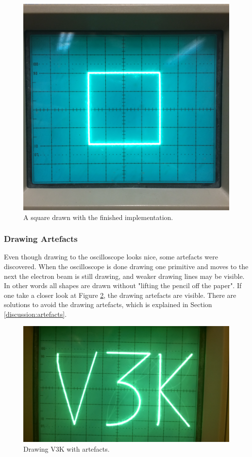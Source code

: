 \begin{figure}[h!]
	    \includegraphics[width=\linewidth]{images/square}
	    \caption{A square drawn with the finished implementation.}
	    \label{fig:square}
\end{figure}


\subsubsection{Drawing Artefacts}
\label{results:artefacts}
Even though drawing to the oscilloscope looks nice, some artefacts were discovered.
When the oscilloscope is done drawing one primitive and moves to the next the electron beam is still drawing,
and weaker drawing lines may be visible.
In other words all shapes are drawn without "lifting the pencil off the paper".
If one take a closer look at Figure \ref{fig:artefact}, the drawing artefacts are visible.
There are solutions to avoid the drawing artefacts, which is explained in Section \ref{discussion:artefacts}.

\begin{figure}[h!]
	    \includegraphics[width=\linewidth]{images/artefacts.jpg}
	    \caption{Drawing V3K with artefacts.}
	    \label{fig:artefact}
\end{figure}

